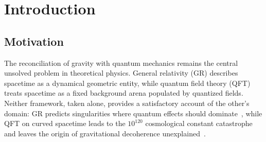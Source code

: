 \documentclass[aps,prd,onecolumn,superscriptaddress,nofootinbib,showpacs,12pt,notitlepage]{revtex4-2}
\begin{document}
\begin{abstract}
objects at all loop orders, leading-order for
matter-filled bodies; the exact non-perturbative
matter-coupled cancellation remains an open task per
MAIN/16), supporting a perturbatively controlled strong
equivalence statement in the scalar sector;
(xiii)~a homogeneous-background no-inflation scenario in
which the first excitations nucleate quantum-mechanically
from the quiescent medium, addressing the horizon,
flatness, and topological-defect issues at the
background-consistency level, while the primordial
perturbation spectrum and superhorizon correlations
remain open numerical work.
The central result---closed on the static spherically symmetric
exterior branch and at leading zero-frequency for time-periodic
oscillons---is the oscillon $\to$ Bernoulli pressure-deficit
$\to$ source $\to 1/r$ field chain for gravity, together with the
reduced-gap/coercive closure showing that, after projection onto
the source manifold, non-neutral deformations remain perturbatively
controlled while the exterior field follows the neutral collective
coordinate.
The remaining sectors show how the same medium picture extends into
cosmology, particle structure, and quantum phenomena; where a sector
still requires a dedicated numerical or structural closure, that
status is stated explicitly in the text and does not affect the core
gravity derivation.
\end{abstract}

\maketitle
\newpage
\tableofcontents
\newpage

\section{Introduction}\label{sec:intro}

\subsection{Motivation}

The reconciliation of gravity with quantum mechanics remains the
central unsolved problem in theoretical physics.  General relativity
(GR) describes spacetime as a dynamical geometric entity, while quantum
field theory (QFT) treats spacetime as a fixed background arena populated
by quantized fields.  Neither framework, taken alone, provides a
satisfactory account of the other's domain: GR predicts singularities
where quantum effects should dominate~\cite{Penrose1965,Hawking1970},
while QFT on curved spacetime leads to the $10^{120}$ cosmological
constant catastrophe~\cite{Weinberg1989,Martin2012} and leaves the
origin of gravitational decoherence
unexplained~\cite{Penrose1996,Diosi1987}.
\end{document}

